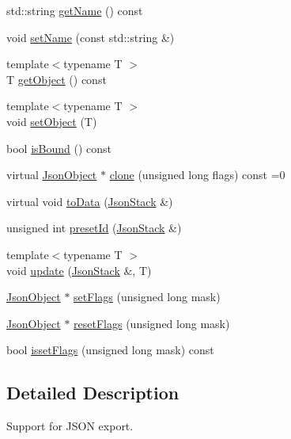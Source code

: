 \begin{DoxyCompactItemize}
\item 
std\-::string \hyperlink{classHurricane_1_1JsonObject_aff05a24b06a22554d7b22126ba906e72}{get\-Name} () const 
\item 
void \hyperlink{classHurricane_1_1JsonObject_aeda98a478720cf29e532e2a11f6f54c5}{set\-Name} (const std\-::string \&)
\item 
{\footnotesize template$<$typename T $>$ }\\T \hyperlink{classHurricane_1_1JsonObject_a95dfe1c35371ee28cfdeba8f290d1d7f}{get\-Object} () const 
\item 
{\footnotesize template$<$typename T $>$ }\\void \hyperlink{classHurricane_1_1JsonObject_aa8e23d2445b90cced19a97d50372314c}{set\-Object} (T)
\item 
bool \hyperlink{classHurricane_1_1JsonObject_aba8ed550f36d6a62bf9fe45838b101f8}{is\-Bound} () const 
\item 
virtual \hyperlink{classHurricane_1_1JsonObject}{Json\-Object} $\ast$ \hyperlink{classHurricane_1_1JsonObject_a939cfbae43f7b0d994648d07bdba2b32}{clone} (unsigned long flags) const =0
\item 
virtual void \hyperlink{classHurricane_1_1JsonObject_a57a845ca64ac8912b35c4dbf75723af6}{to\-Data} (\hyperlink{classHurricane_1_1JsonStack}{Json\-Stack} \&)
\item 
unsigned int \hyperlink{classHurricane_1_1JsonObject_a3819d0c96ee99277e4cc8d349dc4155c}{preset\-Id} (\hyperlink{classHurricane_1_1JsonStack}{Json\-Stack} \&)
\item 
{\footnotesize template$<$typename T $>$ }\\void \hyperlink{classHurricane_1_1JsonObject_ace589494452d9d797506286613642cd4}{update} (\hyperlink{classHurricane_1_1JsonStack}{Json\-Stack} \&, T)
\item 
\hyperlink{classHurricane_1_1JsonObject}{Json\-Object} $\ast$ \hyperlink{classHurricane_1_1JsonObject_a5216e5f5d74f8dbf8665eef8a78b2fe1}{set\-Flags} (unsigned long mask)
\item 
\hyperlink{classHurricane_1_1JsonObject}{Json\-Object} $\ast$ \hyperlink{classHurricane_1_1JsonObject_a8346b1c958574275fe17f9c4cb40ee8b}{reset\-Flags} (unsigned long mask)
\item 
bool \hyperlink{classHurricane_1_1JsonObject_adede141746ee05a131aa6d0c673a7c03}{isset\-Flags} (unsigned long mask) const 
\end{DoxyCompactItemize}


\subsection{Detailed Description}
Support for J\-S\-O\-N export. 

